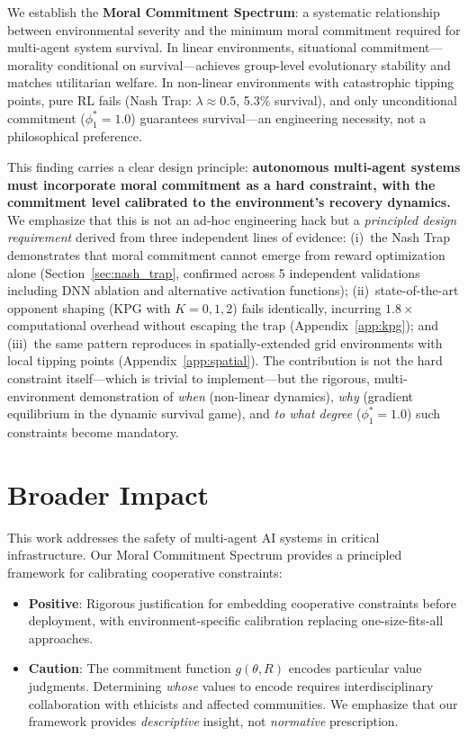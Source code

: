 \documentclass{article}
\begin{document}
We establish the \textbf{Moral Commitment Spectrum}: a systematic relationship between environmental severity and the minimum moral commitment required for multi-agent system survival.
In linear environments, situational commitment---morality conditional on survival---achieves group-level evolutionary stability and matches utilitarian welfare.
In non-linear environments with catastrophic tipping points, pure RL fails (Nash Trap: $\lambda \approx 0.5$, 5.3\% survival), and only unconditional commitment ($\phi_1^* = 1.0$) guarantees survival---an engineering necessity, not a philosophical preference.

This finding carries a clear design principle: \textbf{autonomous multi-agent systems must incorporate moral commitment as a hard constraint, with the commitment level calibrated to the environment's recovery dynamics.}
We emphasize that this is not an ad-hoc engineering hack but a \emph{principled design requirement} derived from three independent lines of evidence:
(i)~the Nash Trap demonstrates that moral commitment cannot emerge from reward optimization alone (Section~\ref{sec:nash_trap}, confirmed across 5 independent validations including DNN ablation and alternative activation functions);
(ii)~state-of-the-art opponent shaping (KPG with $K{=}0,1,2$) fails identically, incurring $1.8\times$ computational overhead without escaping the trap (Appendix~\ref{app:kpg});
and (iii)~the same pattern reproduces in spatially-extended grid environments with local tipping points (Appendix~\ref{app:spatial}).
The contribution is not the hard constraint itself---which is trivial to implement---but the rigorous, multi-environment demonstration of \emph{when} (non-linear dynamics), \emph{why} (gradient equilibrium in the dynamic survival game), and \emph{to what degree} ($\phi_1^* = 1.0$) such constraints become mandatory.

\section*{Broader Impact}\label{sec:broader_impact}

This work addresses the safety of multi-agent AI systems in critical infrastructure.
Our Moral Commitment Spectrum provides a principled framework for calibrating cooperative constraints:
\begin{itemize}
    \item \textbf{Positive}: Rigorous justification for embedding cooperative constraints before deployment, with environment-specific calibration replacing one-size-fits-all approaches.
    \item \textbf{Caution}: The commitment function $g(\theta, R)$ encodes particular value judgments. Determining \emph{whose} values to encode requires interdisciplinary collaboration with ethicists and affected communities.
    We emphasize that our framework provides \textit{descriptive} insight, not \textit{normative} prescription.
\end{itemize}
\end{document}
